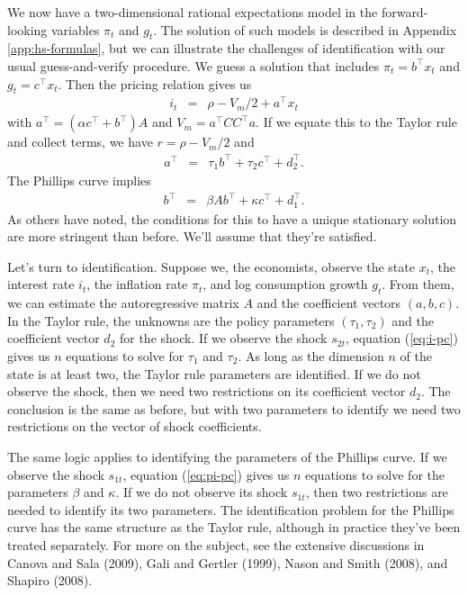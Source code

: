 \documentclass[12pt]{article}
\begin{document}
{We now have a two-dimensional rational expectations model
in the forward-looking variables $\pi_t$ and $g_t$.
The solution of such models is described in Appendix \ref{app:hs-formulas},
but we can illustrate the challenges of identification
with our usual guess-and-verify procedure.
We guess a solution that includes
$\pi_t = b^\top x_t$ and $g_t = c^\top x_t$.
Then the pricing relation gives us
\begin{eqnarray*}
        i_t &=& \rho - V_m/2 + a^\top x_t %
\end{eqnarray*}
with
$  a^\top =  (\alpha c^\top + b^\top)  A  $
and $  V_m = a^\top C C^\top a $.
If we equate this to the Taylor rule and collect terms,
we have $ r = \rho - V_m/2 $ and
\begin{eqnarray}
    a^\top &=& \tau_1 b^\top + \tau_2 c^\top + d_2^\top .
    \label{eq:i-pc}
\end{eqnarray}
The Phillips curve implies
\begin{eqnarray}
    b^\top &=& \beta  A  b^\top + \kappa c^\top + d_1^\top .
    \label{eq:pi-pc}
\end{eqnarray}
As others have noted, the conditions for this to have a unique stationary solution
are more stringent than before.
We'll assume that they're satisfied.


Let's turn to identification.
Suppose we, the economists, observe the state $x_t$, the interest rate $i_t$,
the inflation rate $\pi_t$, and log consumption growth $g_t$.
From them, we can estimate the autoregressive matrix $ A $
and the coefficient vectors $(a,b,c)$.
In the Taylor rule, the unknowns are the policy parameters $(\tau_1,\tau_2)$
and the coefficient vector $d_2$ for the shock.
If we observe the shock $s_{2t}$,
equation (\ref{eq:i-pc}) gives us $n$ equations
to solve for $\tau_1$ and $\tau_2$.
As long as the dimension $n$ of the state is at least two, the Taylor rule
parameters are identified.
If we do not observe the shock, then we need two restrictions on its
coefficient vector $d_2$.
The conclusion is the same as before,
but with two parameters to identify we need two restrictions
on the vector of shock coefficients.

The same logic applies to identifying the parameters of the Phillips curve.
If we observe the shock $s_{1t}$,
equation (\ref{eq:pi-pc}) gives us $n$ equations to solve for
the parameters $\beta$ and $\kappa$.
If we do not observe its shock $s_{1t}$, then two restrictions are needed
to identify its two parameters.
The identification problem for the Phillips curve has the same structure as
the Taylor rule, although in practice they've been treated separately.
For more on the subject,
see the extensive discussions in Canova and Sala (2009),
Gali and Gertler (1999),
Nason and Smith (2008), and Shapiro (2008).

}
\end{document}

